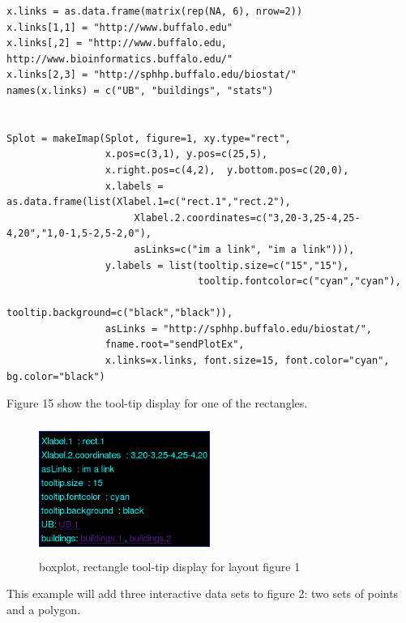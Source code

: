 \documentclass[]{article}
\begin{document}
\begin{verbatim}
x.links = as.data.frame(matrix(rep(NA, 6), nrow=2))
x.links[1,1] = "http://www.buffalo.edu"
x.links[,2] = "http://www.buffalo.edu, http://www.bioinformatics.buffalo.edu/"
x.links[2,3] = "http://sphhp.buffalo.edu/biostat/"
names(x.links) = c("UB", "buildings", "stats")


Splot = makeImap(Splot, figure=1, xy.type="rect", 
                 x.pos=c(3,1), y.pos=c(25,5),
                 x.right.pos=c(4,2),  y.bottom.pos=c(20,0),  
                 x.labels = as.data.frame(list(Xlabel.1=c("rect.1","rect.2"),
                      Xlabel.2.coordinates=c("3,20-3,25-4,25-4,20","1,0-1,5-2,5-2,0"),
                      asLinks=c("im a link", "im a link"))),
                 y.labels = list(tooltip.size=c("15","15"),
                                 tooltip.fontcolor=c("cyan","cyan"), 
                                 tooltip.background=c("black","black")),
                 asLinks = "http://sphhp.buffalo.edu/biostat/",
                 fname.root="sendPlotEx",
                 x.links=x.links, font.size=15, font.color="cyan", bg.color="black")
\end{verbatim}

Figure 15 show the tool-tip display for one of the rectangles.

 
\begin{center}
\begin{figure}
\includegraphics[width=2.2in, height=1.7in]{tip3}
\caption{boxplot, rectangle tool-tip display for layout figure 1}
\end{figure}
\end{center}


\vspace{5mm}



\vspace{5mm}

\normalsize

This example will add three interactive data sets to figure 2: two sets of points and a polygon. 
\end{document}

